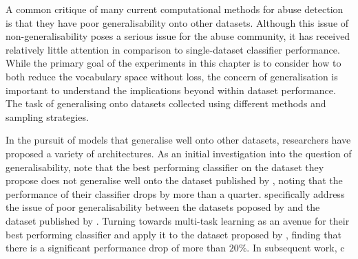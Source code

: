 A common critique of many current computational methods for abuse detection is that they have poor generalisability onto other datasets. Although this issue of non-generalisability poses a serious issue for the abuse community, it has received relatively little attention \citep{Waseem:2016,Waseem:2018,Karan:2018,Wiegand:2019,Swamy:2019,Fortuna:2021,Glavas:2020} in comparison to single-dataset classifier performance. While the primary goal of the experiments in this chapter is to consider how to both reduce the vocabulary space without loss, the concern of generalisation is important to understand the implications beyond within dataset performance. The task of generalising onto datasets collected using different methods and sampling strategies.

In the pursuit of models that generalise well onto other datasets, researchers have proposed a variety of architectures. As an initial investigation into the question of generalisability, \citet{Waseem:2016} note that the best performing classifier on the dataset they propose does not generalise well onto the dataset published by \citet{Waseem-Hovy:2016}, noting that the performance of their classifier drops by more than a quarter. \citet{Waseem:2018} specifically address the issue of poor generalisability between the datasets poposed by \citet{Waseem:2016,Waseem-Hovy:2016} and the dataset published by \citet{Davidson:2017}. Turning towards multi-task learning as an avenue for
their best performing classifier and apply it to the dataset proposed by \citet{Waseem-Hovy:2016}, finding that there is a significant performance drop of more than $20\%$. In subsequent work, \citet{Waseem:2018} c





